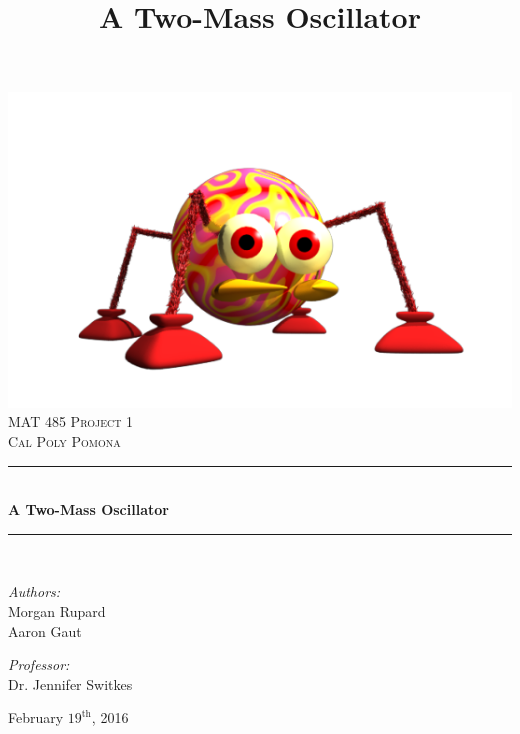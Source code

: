 \documentclass[11pt, oneside]{article}   	%
\title{A Two-Mass Oscillator}
\newcommand{\HRule}{\rule{\linewidth}{0.5mm}}
\begin{document}
\begin{titlepage}
		\begin{center}
			\includegraphics[scale=0.2]{logo}\\[1cm]
			
			\textsc{\LARGE MAT 485 Project 1}\\[2cm]
			\textsc{\Large Cal Poly Pomona}\\[1cm]
			
		
			\HRule \\[0.4cm]
			{\huge \bfseries A Two-Mass Oscillator \\[0.4cm]}
			\HRule \\[2cm]
			
			\noindent
			\begin{minipage}{0.4\textwidth}
				\begin{flushleft}
					\large
					\emph{Authors:}\\
					Morgan Rupard \\ Aaron Gaut
				\end{flushleft}
			\end{minipage}
			\begin{minipage}{0.4\textwidth}
				\begin{flushright}
					\large
					\emph{Professor:}\\
					Dr. Jennifer Switkes
			\end{flushright}
			\end{minipage}
			
			\vfill
			
			{\large February $19^{\text{th}}$, 2016}
		\end{center}
	\end{titlepage}

\tableofcontents
\newpage
\end{document}
